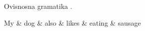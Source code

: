 Ovisnosna gramatika \citep{chang2015learning}.

\begin{dependency}[theme = simple]
\begin{deptext}[column sep=1em]
My \& dog \& also \& likes \& eating \& sausage \\
\end{deptext}
\end{dependency}
